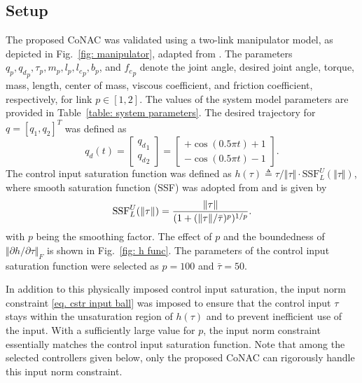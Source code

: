 \documentclass[lettersize,journal]{IEEEtran}
\begin{document}
\subsection{Setup}

The proposed CoNAC was validated using a two-link manipulator model, as depicted in Fig.~\ref{fig: manipulator}, adapted from \cite{RN32}. 
The parameters $q_p,{q_d}_p,\tau_p,m_p,l_p,{l_c}_p,b_p$, and ${f_c}_p$ denote the joint angle, desired joint angle, torque, mass, length, center of mass, viscous coefficient, and friction coefficient, respectively, for link $p\in[1,2]$.
The values of the system model parameters are provided in Table~\ref{table: system parameters}. The desired trajectory for ${q}=[q_1,q_2]^T$ was defined as
\begin{equation*}
    {q_d}(t) = 
    \begin{bmatrix}
        {q_d}_1\\{q_d}_2
    \end{bmatrix}
    =
    \begin{bmatrix}
        +\cos(0.5\pi t) + 1 \\
        -\cos(0.5\pi t) - 1 
    \end{bmatrix}.
\end{equation*}
The control input saturation function was defined as $h(\tau)\triangleq \tau/\Vert\tau\Vert \cdot \text{SSF}_L^U(\Vert\tau\Vert)$, where smooth saturation function (SSF) was adopted from \cite{RN28} and is given by
\begin{equation}
    \text{SSF}_L^U(\Vert\tau\Vert) = {\Vert\tau\Vert\over (1+(\Vert\tau\Vert/\bar\tau)^p)^{1/p}}.
    \label{eq. h func}
\end{equation}
with $p$ being the smoothing factor. The effect of $p$ and the boundedness of $\Vert\partial h/\partial \tau\Vert_F$ is shown in Fig.~\ref{fig: h func}.
The parameters of the control input saturation function were selected as $p=100$ and $\bar\tau=50$. 

In addition to this physically imposed control input saturation, the input norm constraint \eqref{eq. cstr input ball} was imposed to ensure that the control input $\tau$ stays within the unsaturation region of $h(\tau)$ and to prevent inefficient use of the input. With a sufficiently large value for $p$, the input norm constraint essentially matches the control input saturation function. Note that among the selected controllers given below, only the proposed CoNAC can rigorously handle this input norm constraint.
\end{document}
